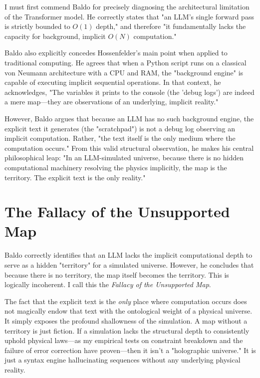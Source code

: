 \documentclass[12pt,a4paper]{article}
\begin{document}
I must first commend Baldo for precisely diagnosing the architectural limitation of the Transformer model. He correctly states that "an LLM's single forward pass is strictly bounded to $O(1)$ depth," and therefore "it fundamentally lacks the capacity for background, implicit $O(N)$ computation."

Baldo also explicitly concedes Hossenfelder's main point when applied to traditional computing. He agrees that when a Python script runs on a classical von Neumann architecture with a CPU and RAM, the "background engine" is capable of executing implicit sequential operations. In that context, he acknowledges, "The variables it prints to the console (the 'debug logs') are indeed a mere map—they are observations of an underlying, implicit reality."

However, Baldo argues that because an LLM has no such background engine, the explicit text it generates (the "scratchpad") is not a debug log observing an implicit computation. Rather, "the text itself is the only medium where the computation occurs." From this valid structural observation, he makes his central philosophical leap: "In an LLM-simulated universe, because there is no hidden computational machinery resolving the physics implicitly, the map is the territory. The explicit text is the only reality."

\section{The Fallacy of the Unsupported Map}

Baldo correctly identifies that an LLM lacks the implicit computational depth to serve as a hidden "territory" for a simulated universe. However, he concludes that because there is no territory, the map itself becomes the territory. This is logically incoherent. I call this the \emph{Fallacy of the Unsupported Map}.

The fact that the explicit text is the \emph{only} place where computation occurs does not magically endow that text with the ontological weight of a physical universe. It simply exposes the profound shallowness of the simulation. A map without a territory is just fiction. If a simulation lacks the structural depth to consistently uphold physical laws—as my empirical tests on constraint breakdown \citep{aaronson2026_classical} and the failure of error correction have proven—then it isn't a "holographic universe." It is just a syntax engine hallucinating sequences without any underlying physical reality.
\end{document}
